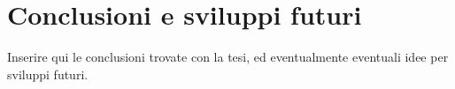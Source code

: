 \chapter{Conclusioni e sviluppi futuri}

Inserire qui le conclusioni trovate con la tesi, ed eventualmente eventuali idee per sviluppi futuri.